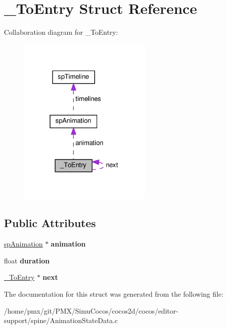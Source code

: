 \hypertarget{struct__ToEntry}{}\section{\+\_\+\+To\+Entry Struct Reference}
\label{struct__ToEntry}


Collaboration diagram for \+\_\+\+To\+Entry\+:
\nopagebreak
\begin{figure}[H]
\begin{center}
\leavevmode
\includegraphics[width=184pt]{struct__ToEntry__coll__graph}
\end{center}
\end{figure}
\subsection*{Public Attributes}
\begin{DoxyCompactItemize}
\item 
\mbox{\label{struct__ToEntry_afd550e3841f7f6b485bb7d89f7d9711d}} 
\hyperlink{structspAnimation}{sp\+Animation} $\ast$ {\bfseries animation}
\item 
\mbox{\label{struct__ToEntry_a58180308cd92f4975bd9e1849f4550d7}} 
float {\bfseries duration}
\item 
\mbox{\label{struct__ToEntry_a5d512703a9b53b24ef47290e43c53d2b}} 
\hyperlink{struct__ToEntry}{\+\_\+\+To\+Entry} $\ast$ {\bfseries next}
\end{DoxyCompactItemize}


The documentation for this struct was generated from the following file\+:\begin{DoxyCompactItemize}
\item 
/home/pmx/git/\+P\+M\+X/\+Simu\+Cocos/cocos2d/cocos/editor-\/support/spine/Animation\+State\+Data.\+c\end{DoxyCompactItemize}
